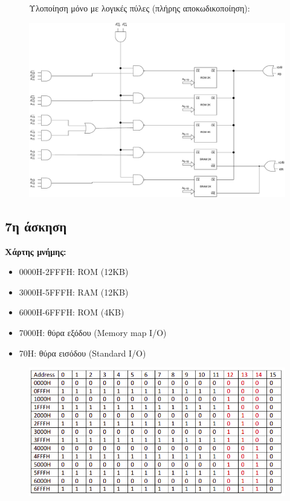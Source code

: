 \documentclass[a4paper]{article}
\begin{document}
\begin{landscape}

\begin{figure}[H]
Υλοποίηση μόνο με λογικές πύλες (πλήρης αποκωδικοποίηση):
\begin{center}
\includegraphics[width=1.3\textwidth]{ex6b.pdf}
\end{center}
\end{figure}
\end{landscape}

\subsection*{7η άσκηση}

\textbf{Χάρτης μνήμης:}

\begin{itemize}
\item 0000Η-2FFFΗ: ROM (12KΒ)
\item 3000Η-5FFFΗ: RAM (12KΒ)
\item 6000Η-6FFFΗ: ROM (4KΒ)
\item 7000Η: θύρα εξόδου (Memory map I/O)
\item 70Η: θύρα εισόδου (Standard I/O)
\end{itemize}

\begin{figure}[H]
	\includegraphics[width=\textwidth]{ex7table.png}
\end{figure}
\end{document}
